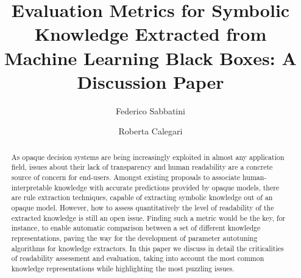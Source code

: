 \documentclass[sigconf]{acmart}
\begin{document}
\title{Evaluation Metrics for Symbolic Knowledge Extracted from Machine Learning Black Boxes: A Discussion Paper}

\author{Federico Sabbatini}

\author{Roberta Calegari}

\renewcommand{\shortauthors}{F. Sabbatini, R. Calegari}

\begin{abstract}
  As opaque decision systems are being increasingly exploited in almost any application field, issues about their lack of transparency and human readability are a concrete source of concern for end-users.
  Amongst existing proposals to associate human-interpretable knowledge with accurate predictions provided by opaque models, there are rule extraction techniques, capable of extracting symbolic knowledge out of an opaque model.
  However, how to assess quantitatively the level of readability of the extracted knowledge is still an open issue.
  Finding such a metric would be the key, for instance, to enable automatic comparison between a set of different knowledge representations, paving the way for the development of parameter autotuning algorithms for knowledge extractors.
  In this paper we discuss in detail the criticalities of readability assessment and evaluation, taking into account the most common knowledge representations while highlighting the most puzzling issues.
\end{abstract}
\end{document}
